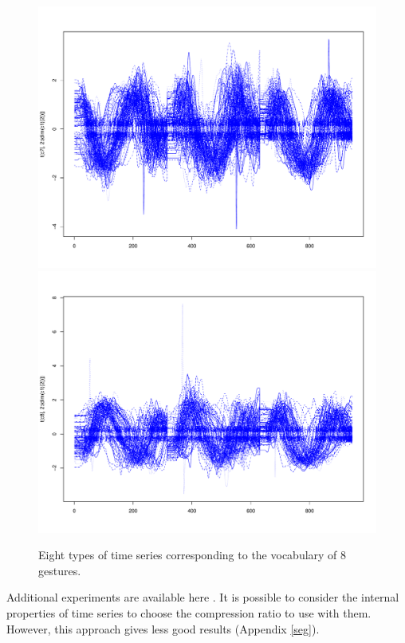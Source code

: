 \begin{figure}
\includegraphics[scale=0.1]{images/c7}
\includegraphics[scale=0.1]{images/c8}

\caption{Eight types of time series corresponding to the vocabulary of 8 gestures.}

\label{geste}
\end{figure}



 Additional experiments are available here \cite{Vanel}. It is possible to consider the internal properties of time series to choose the compression ratio to use with them. However, this approach gives less good results (Appendix \ref{seg}).

